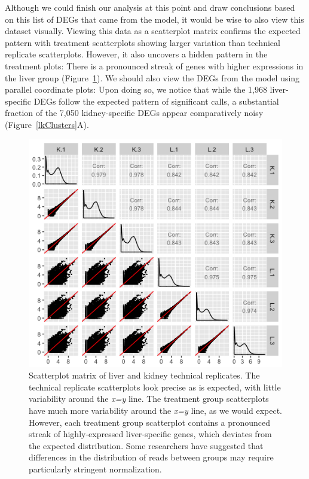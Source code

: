 \documentclass[11pt,a4paper,oldfontcommands,openany]{memoir}
\numberwithin{equation}{section} %
\begin{document}
Although we could finish our analysis at this point and draw conclusions based on this list of DEGs that came from the model, it would be wise to also view this dataset visually. Viewing this data as a scatterplot matrix confirms the expected pattern with treatment scatterplots showing larger variation than technical replicate scatterplots. However, it also uncovers a hidden pattern in the treatment plots: There is a pronounced streak of genes with higher expressions in the liver group (Figure~\ref{lkSM}). We should also view the DEGs from the model using parallel coordinate plots: Upon doing so, we notice that while the 1,968 liver-specific DEGs follow the expected pattern of significant calls, a substantial fraction of the 7,050 kidney-specific DEGs appear comparatively noisy (Figure~\ref{lkClusters}A).

\begin{figure}[!tpb]
\begin{framed}
\centerline{\includegraphics[width=1\columnwidth]{MakeFigures/lkSM.jpg}}
\end{framed}
\caption{Scatterplot matrix of liver and kidney technical replicates. The technical replicate scatterplots look precise as is expected, with little variability around the \textit{x=y} line. The treatment group scatterplots have much more variability around the \textit{x=y} line, as we would expect. However, each treatment group scatterplot contains a pronounced streak of highly-expressed liver-specific genes, which deviates from the expected distribution. Some researchers have suggested that differences in the distribution of reads between groups may require particularly stringent normalization.
\label{lkSM}}
\end{figure}
\end{document}
